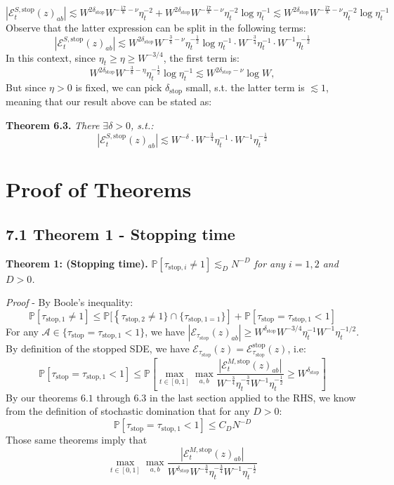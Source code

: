 \documentclass[11pt]{article}
\newenvironment{boxtheorem}[1]
  {\begin{mdframed}\noindent\textbf{#1}\itshape\space}
  {\end{mdframed}}
\newcommand{\E}{\mathcal{E}}
\newcommand{\sto}{\text{stop}}
\begin{document}
\begin{equation*}
|\E_t^{S, \sto}(z)_{ab}|\lesssim W^{2\delta_\sto} W^{-\frac{17}{8}-\nu} \eta_t^{-2}+W^{2\delta_\sto}W^{-\frac{17}{8}-\nu}\eta_t^{-2}\log \eta_t^{-1} \lesssim W^{2\delta_\sto}W^{-\frac{17}{8}-\nu}\eta_t^{-2}\log \eta_t^{-1}
\end{equation*}
Observe that the latter expression can be split in the following terms: $$|\E_t^{S, \sto}(z)_{ab}|\lesssim W^{2\delta_\sto} W^{-\frac{3}{8}-\nu} \eta_t^{-\frac{1}{2}}\log \eta_t^{-1}\cdot W^{-\frac{3}{4}}\eta_t^{-1}\cdot W^{-1}\eta_t^{-\frac{1}{2}}$$
In this context, since $\eta_t \geq \eta\geq W^{-3/4}$, the first term is: $$W^{2\delta_\sto} W^{-\frac{3}{8}-\eta}\eta_t^{-\frac{1}{2}}\log \eta_t^{-1}\lesssim W^{2\delta_\sto-\nu}\log W,$$
But since $\eta>0$ is fixed, we can pick $\delta_\sto$ small, s.t. the latter term is $\lesssim 1$, meaning that our result above can be stated as: 
\begin{boxtheorem}{Theorem 6.3. }There $\exists \delta>0$, s.t.:
$$|\E_t^{S, \sto}(z)_{ab}|\lesssim W^{-\delta}\cdot W^{-\frac{3}{4}}\eta_t^{-1}\cdot W^{-1}\eta_t^{-\frac{1}{2}}$$
\end{boxtheorem}

\newpage

\section{Proof of Theorems}

\subsection*{7.1 Theorem 1 - Stopping time}
\label{proof-stop}

\begin{boxtheorem}{Theorem 1: (Stopping time).} $\mathbb{P}[\tau_{\text{stop}, i} \neq  1] \lesssim_D N^{-D}$ for any $i=1, 2$ and $D > 0$.
\end{boxtheorem}
\textit{Proof} - By Boole's inequality: $$\mathbb{P}\left[\tau_{\sto, 1}\neq 1\right]\leq \mathbb{P}[\left\{\tau_{\sto, 2}\neq 1\}\cap \{\tau_{\sto, 1=1}\}\right]+\mathbb{P}[\tau_\sto=\tau_{\sto, 1}<1]$$
For any $\mathcal{A}\in \{\tau_\sto = \tau_{\sto, 1}<1\}$, we have $|\E_{\tau_\sto}(z)_{ab}|\geq W^{\delta_\sto}W^{-3/4}\eta_t^{-1}W^{-1}\eta_t^{-1/2}$. By definition of the stopped SDE, we have $\E_{\tau_\sto}(z) = \E_{\tau_\sto}^{\sto}(z)$, i.e: $$\mathbb{P}\left[\tau_\sto = \tau_{\sto, 1}<1\right]\leq \mathbb{P}\left[\max_{t\in [0, 1]}\max_{a, b}\frac{|\E_t^{M, \sto}(z)_{ab}|}{W^{-\frac{3}{4}}\eta_t^{-\frac{3}{4}}W^{-1}\eta_t^{-\frac{1}{2}}}\geq W^{\delta_\sto}\right]$$
By our theorems $6.1$ through $6.3$ in the last section applied to the RHS, we know from the definition of stochastic domination that for any $D>0$: 
$$\mathbb{P}\left[ \tau_\sto = \tau_{\sto, 1}<1\right]\leq C_DN^{-D}$$
Those same theorems imply that $$\max_{t\in [0, 1]}\max_{a, b}\frac{|\E_t^{M, \sto}(z)_{ab}|}{W^{\delta_\sto}W^{-\frac{3}{4}}\eta_t^{-\frac{3}{4}}W^{-1}\eta_t^{-\frac{1}{2}}}$$
\end{document}
